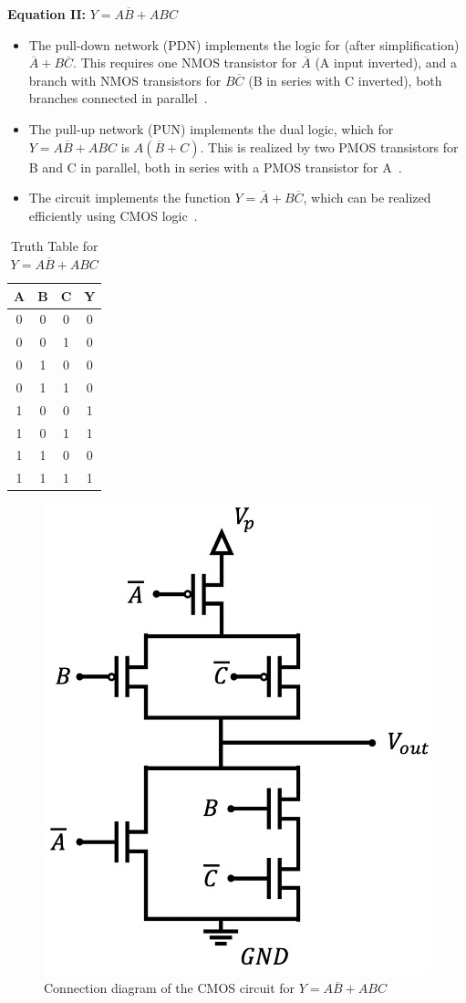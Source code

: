 \documentclass[12pt]{article}
\begin{document}
\textbf{Equation II:} \( Y = A\overline{B} + ABC \)

\begin{itemize}
  \item The pull-down network (PDN) implements the logic for (after simplification) \( \overline{A} + B\overline{C} \). This requires one NMOS transistor for \( \overline{A} \) (A input inverted), and a branch with NMOS transistors for \( B\overline{C} \) (B in series with C inverted), both branches connected in parallel~\cite{WesteHarrisCMOS,RabaeyDigitalIC}.
  \item The pull-up network (PUN) implements the dual logic, which for \( Y = A\overline{B} + ABC \) is \( A(\overline{B} + C) \). This is realized by two PMOS transistors for B and C in parallel, both in series with a PMOS transistor for A~\cite{WesteHarrisCMOS}.
  \item The circuit implements the function \( Y = \overline{A} + B\overline{C} \), which can be realized efficiently using CMOS logic~\cite{RabaeyDigitalIC}.
\end{itemize}

\begin{multicols}{2}
  \begin{table}[H]
    \centering
    \caption{Truth Table for \( Y = A\overline{B} + ABC \)}
    \begin{tabular}{|c|c|c|c|}
      \hline
      A & B & C & Y \\
      \hline
      0 & 0 & 0 & 0 \\
      0 & 0 & 1 & 0 \\
      0 & 1 & 0 & 0 \\
      0 & 1 & 1 & 0 \\
      1 & 0 & 0 & 1 \\
      1 & 0 & 1 & 1 \\
      1 & 1 & 0 & 0 \\
      1 & 1 & 1 & 1 \\
      \hline
    \end{tabular}
  \end{table}

  \begin{figure}[H]
    \centering
    \includegraphics[width=.3\textwidth]{ck2.png}
    \caption{Connection diagram of the CMOS circuit for \( Y = A\overline{B} + ABC \)}
  \end{figure}
\end{multicols}
\end{document}
